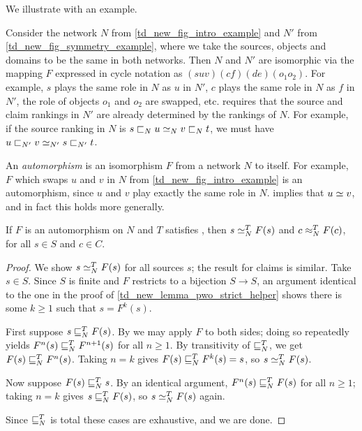We illustrate \symmetry{} with an example.

\begin{example}
    Consider the network $N$ from \cref{td_new_fig_intro_example} and $N'$ from
    \cref{td_new_fig_symmetry_example}, where we take the sources, objects and
    domains to be the same in both networks. Then $N$ and $N'$ are isomorphic
    via the mapping $F$ expressed in cycle notation as $(suv)(cf)(de)(o_1o_2)$.
    For example, $s$ plays the same role in $N$ as $u$ in $N'$, $c$ plays the
    same role in $N$ as $f$ in $N'$, the role of objects $o_1$ and $o_2$ are
    swapped, etc. \symmetry{} requires that the source and claim rankings in
    $N'$ are already determined by the rankings of $N$.  For example, if the
    source ranking in $N$ is $s \sqsubset_N u \simeq_N v \sqsubset_N t$, we must have $u
    \sqsubset_{N'} v \simeq_{N'} s \sqsubset_{N'} t$.
\end{example}

An \emph{automorphism} is an isomorphism $F$ from a network $N$ to itself. For
example, $F$ which swaps $u$ and $v$ in $N$ from
\cref{td_new_fig_intro_example} is an automorphism, since $u$ and $v$ play
exactly the same role in $N$. \symmetry{} implies that $u \simeq v$, and in fact
this holds more generally.

\begin{proposition}
    \label{td_new_prop_automorphism}
    If $F$ is an automorphism on $N$ and $T$ satisfies \symmetry{}, then $s
    \simeq_N^T F(s)$ and $c \approx_N^T F(c)$, for all $s \in S$ and $c \in C$.
\end{proposition}

\begin{proof}
    We show $s \simeq_N^T F(s)$ for all sources $s$; the result for claims is
    similar.
    Take $s \in S$. Since $S$ is finite and $F$ restricts to a bijection $S \to
    S$, an argument identical to the one in the proof of
    \cref{td_new_lemma_pwo_strict_helper} shows there is some $k \ge 1$ such
    that $s = F^k(s)$.

    First suppose $s \sqsubseteq_N^T F(s)$. By \symmetry{} we may apply $F$ to both
    sides; doing so repeatedly yields $F^n(s) \sqsubseteq_N^T F^{n+1}(s)$ for all $n
    \ge 1$. By transitivity of $\sqsubseteq_N^T$, we get $F(s) \sqsubseteq_N^T F^n(s)$.
    Taking $n = k$ gives $F(s) \sqsubseteq_N^T F^k(s) = s$, so $s \simeq_N^T F(s)$.

    Now suppose $F(s) \sqsubseteq_N^T s$. By an identical argument, $F^n(s) \sqsubseteq_N^T
    F(s)$ for all $n \ge 1$; taking $n = k$ gives $s \sqsubseteq_N^T F(s)$, so $s
    \simeq_N^T F(s)$ again.

    Since $\sqsubseteq_N^T$ is total these cases are exhaustive, and we are done.
\end{proof}

